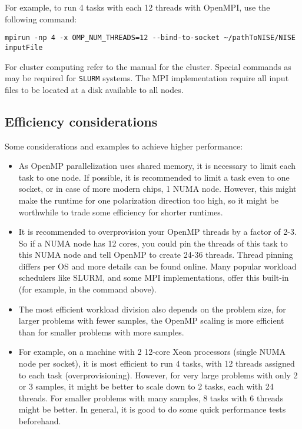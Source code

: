 For example, to run 4 tasks with each 12 threads with OpenMPI, use the following command:
\begin{lstlisting}[style=BashInputStyle]
mpirun -np 4 -x OMP_NUM_THREADS=12 --bind-to-socket ~/pathToNISE/NISE inputFile
\end{lstlisting}

For cluster computing refer to the manual for the cluster. Special commands as  may be required for {\tt SLURM} systems. The MPI implementation require all input files to be located at a disk available to all nodes.

\subsection{Efficiency considerations}
Some considerations and examples to achieve higher performance:
\begin{itemize}
\item As OpenMP parallelization uses shared memory, it is necessary to limit each task to one node. If possible, it is recommended to limit a task even to one socket, or in case of more modern chips, 1 NUMA node. However, this might make the runtime for one polarization direction too high, so it might be worthwhile to trade some efficiency for shorter runtimes.
\item It is recommended to overprovision your OpenMP threads by a factor of 2-3. So if a NUMA node has 12 cores, you could pin the threads of this task to this NUMA node and tell OpenMP to create 24-36 threads. Thread pinning differs per OS and more details can be found online. Many popular workload schedulers like SLURM, and some MPI implementations, offer this built-in (for example,  in the command above).
\item The most efficient workload division also depends on the problem size, for larger problems with fewer samples, the OpenMP scaling is more efficient than for smaller problems with more samples.
\item For example, on a machine with 2 12-core Xeon processors (single NUMA node per socket), it is most efficient to run 4 tasks, with 12 threads assigned to each task (overprovisioning). However, for very large problems with only 2 or 3 samples, it might be better to scale down to 2 tasks, each with 24 threads. For smaller problems with many samples, 8 tasks with 6 threads might be better. In general, it is good to do some quick performance tests beforehand.
\end{itemize}

